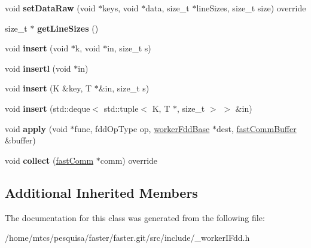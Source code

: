 \begin{DoxyCompactItemize}
\item 
\hypertarget{classfaster_1_1__workerIFdd_3_01K_00_01T_01_5_01_4_a57c605c3fa28525e1d9e7298f51c9eba}{}void {\bfseries set\+Data\+Raw} (void $\ast$keys, void $\ast$data, size\+\_\+t $\ast$line\+Sizes, size\+\_\+t size) override\label{classfaster_1_1__workerIFdd_3_01K_00_01T_01_5_01_4_a57c605c3fa28525e1d9e7298f51c9eba}

\item 
\hypertarget{classfaster_1_1__workerIFdd_3_01K_00_01T_01_5_01_4_a4ace039e4e5c6a058699d5447f4cf7be}{}size\+\_\+t $\ast$ {\bfseries get\+Line\+Sizes} ()\label{classfaster_1_1__workerIFdd_3_01K_00_01T_01_5_01_4_a4ace039e4e5c6a058699d5447f4cf7be}

\item 
\hypertarget{classfaster_1_1__workerIFdd_3_01K_00_01T_01_5_01_4_a3db09bd9059972c58ca4c80c6e91f708}{}void {\bfseries insert} (void $\ast$k, void $\ast$in, size\+\_\+t s)\label{classfaster_1_1__workerIFdd_3_01K_00_01T_01_5_01_4_a3db09bd9059972c58ca4c80c6e91f708}

\item 
\hypertarget{classfaster_1_1__workerIFdd_3_01K_00_01T_01_5_01_4_abc6e05cdc657b13d1be0f982bb10fc39}{}void {\bfseries insertl} (void $\ast$in)\label{classfaster_1_1__workerIFdd_3_01K_00_01T_01_5_01_4_abc6e05cdc657b13d1be0f982bb10fc39}

\item 
\hypertarget{classfaster_1_1__workerIFdd_3_01K_00_01T_01_5_01_4_a35dcc846531b81fc275c27543431c4f4}{}void {\bfseries insert} (K \&key, T $\ast$\&in, size\+\_\+t s)\label{classfaster_1_1__workerIFdd_3_01K_00_01T_01_5_01_4_a35dcc846531b81fc275c27543431c4f4}

\item 
\hypertarget{classfaster_1_1__workerIFdd_3_01K_00_01T_01_5_01_4_a080a81ca5fe2ccb6b334cf7f79687592}{}void {\bfseries insert} (std\+::deque$<$ std\+::tuple$<$ K, T $\ast$, size\+\_\+t $>$ $>$ \&in)\label{classfaster_1_1__workerIFdd_3_01K_00_01T_01_5_01_4_a080a81ca5fe2ccb6b334cf7f79687592}

\item 
\hypertarget{classfaster_1_1__workerIFdd_3_01K_00_01T_01_5_01_4_ad7a6eec794f2e76aea09cfc13549f4fa}{}void {\bfseries apply} (void $\ast$func, fdd\+Op\+Type op, \hyperlink{classfaster_1_1workerFddBase}{worker\+Fdd\+Base} $\ast$dest, \hyperlink{classfaster_1_1fastCommBuffer}{fast\+Comm\+Buffer} \&buffer)\label{classfaster_1_1__workerIFdd_3_01K_00_01T_01_5_01_4_ad7a6eec794f2e76aea09cfc13549f4fa}

\item 
\hypertarget{classfaster_1_1__workerIFdd_3_01K_00_01T_01_5_01_4_a08a086dbb306041e85d9191312a9dd8a}{}void {\bfseries collect} (\hyperlink{classfaster_1_1fastComm}{fast\+Comm} $\ast$comm) override\label{classfaster_1_1__workerIFdd_3_01K_00_01T_01_5_01_4_a08a086dbb306041e85d9191312a9dd8a}

\end{DoxyCompactItemize}
\subsection*{Additional Inherited Members}


The documentation for this class was generated from the following file\+:\begin{DoxyCompactItemize}
\item 
/home/mtcs/pesquisa/faster/faster.\+git/src/include/\+\_\+worker\+I\+Fdd.\+h\end{DoxyCompactItemize}

